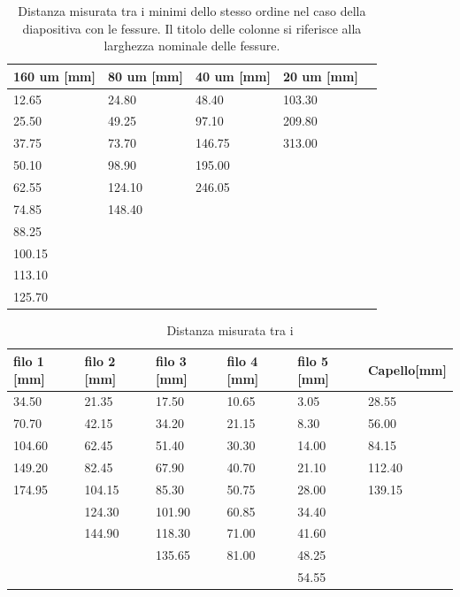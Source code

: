 \begin{table}
    \centering
    \footnotesize
    \begin{tabular}{l l l l l}
        \toprule
        160 um [mm]&    80 um [mm]&        40 um [mm]&     20 um [mm]\\
        \midrule
        12.65&       24.80&                        48.40&          103.30\\
        25.50&       49.25&                        97.10&          209.80\\
        37.75&       73.70&                        146.75&         313.00\\
        50.10&       98.90&                        195.00&\\
        62.55&      124.10&                       246.05&\\
        74.85&      148.40&&\\                       
        88.25&          &&\\
        100.15&&&\\
        113.10&&&\\
        125.70&&&\\
        \bottomrule
    \end{tabular}
    \caption{Distanza misurata tra i minimi dello stesso ordine nel caso della diapositiva con le fessure.
        Il titolo delle colonne si riferisce alla larghezza nominale delle fessure.}
    \label{tab:fessure}
\end{table}

\begin{table}
    \centering
    \footnotesize
    \begin{tabular}{l l l l l l}
        \toprule
        filo 1 [mm]&         filo 2 [mm]&         filo 3 [mm]&         filo 4 [mm]&         filo 5 [mm]&         Capello[mm]\\
        \midrule
        34.50&          21.35&          17.50&          10.65&          3.05&           28.55\\
        70.70&          42.15&          34.20&          21.15&          8.30&           56.00\\
        104.60&         62.45&          51.40&          30.30&          14.00&          84.15\\
        149.20&         82.45&          67.90&          40.70&          21.10&          112.40\\
        174.95&         104.15&         85.30&          50.75&          28.00&          139.15\\
        &              124.30&         101.90&         60.85&          34.40&          \\
        &              144.90&         118.30&         71.00&          41.60&          \\
        &              &              135.65&         81.00&          48.25&          \\
        &              &              &              &              54.55&          \\
        \bottomrule
    \end{tabular}
    \caption{Distanza misurata tra i }
    \label{tab:fili}
\end{table}

